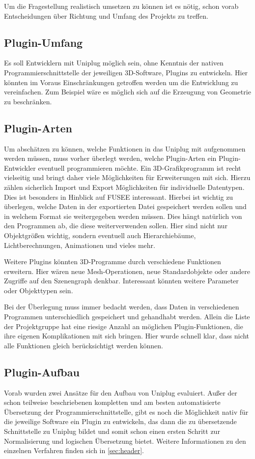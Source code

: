  \label{sec:Vorueberlegungen}

Um die Fragestellung realistisch umsetzen zu können ist es nötig, schon vorab Entscheidungen über Richtung und Umfang des Projekts zu treffen.

\subsection{Plugin-Umfang}
Es soll Entwicklern mit Uniplug möglich sein, ohne Kenntnis der nativen Programmierschnittstelle der jeweiligen 3D-Software, Plugins zu entwickeln. Hier könnten im Voraus Einschränkungen getroffen werden um die Entwicklung zu vereinfachen. Zum Beispiel wäre es möglich sich auf die Erzeugung von Geometrie zu beschränken.

\subsection{Plugin-Arten}
Um abschätzen zu können, welche Funktionen in das Uniplug mit aufgenommen werden müssen, muss vorher überlegt werden, welche Plugin-Arten ein Plugin-Entwickler eventuell programmieren möchte. Ein 3D-Grafikprogramm ist recht vielseitig und bringt daher viele Möglichkeiten für Erweiterungen mit sich. Hierzu zählen sicherlich Import und Export Möglichkeiten für individuelle Datentypen. Dies ist besonders in Hinblick auf FUSEE interessant. Hierbei ist wichtig zu überlegen, welche Daten in der exportierten Datei gespeichert werden sollen und in welchem Format sie weitergegeben werden müssen. Dies hängt natürlich von den Programmen ab, die diese weiterverwenden sollen. Hier sind nicht nur Objektgrößen wichtig, sondern eventuell auch Hierarchiebäume, Lichtberechnungen, Animationen und vieles mehr.

Weitere Plugins könnten 3D-Programme durch verschiedene Funktionen erweitern. Hier wären neue Mesh-Operationen, neue Standardobjekte oder andere Zugriffe auf den Szenengraph denkbar. Interessant könnten weitere Parameter oder Objekttypen sein.

Bei der Überlegung muss immer bedacht werden, dass Daten in verschiedenen Programmen unterschiedlich gespeichert und gehandhabt werden. Allein die Liste der Projektgruppe hat eine riesige Anzahl an möglichen Plugin-Funktionen, die ihre eigenen Komplikationen mit sich bringen. Hier wurde schnell klar, dass nicht alle Funktionen gleich berücksichtigt werden können.
 
\subsection{Plugin-Aufbau}
Vorab wurden zwei Ansätze für den Aufbau von Uniplug evaluiert. Außer der schon teilweise beschriebenen kompletten und am besten automatisierte Übersetzung der Programmierschnittstelle, gibt es noch die Möglichkeit nativ für die jeweilige Software ein Plugin zu entwickeln, das dann die zu übersetzende Schnittstelle zu Uniplug bildet und somit schon einen ersten Schritt zur Normalisierung und logischen Übersetzung bietet. Weitere Informationen zu den einzelnen Verfahren finden sich in \ref{sec:header}.

